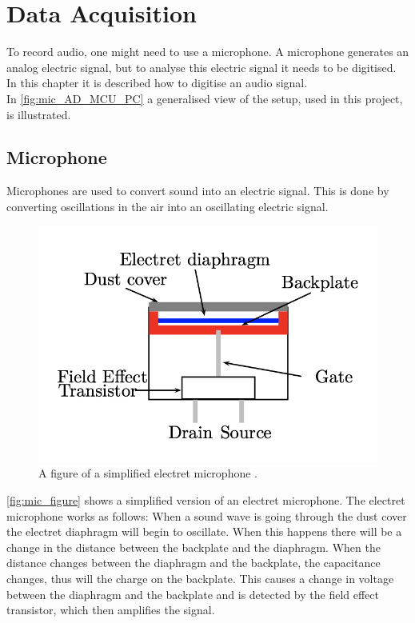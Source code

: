 \chapter{Data Acquisition}
To record audio, one might need to use a microphone. A microphone generates an analog electric signal, but to analyse this electric signal it needs to be digitised. In this chapter it is described how to digitise an audio signal.\\
In \autoref{fig:mic_AD_MCU_PC} a generalised view of the setup, used in this project, is illustrated.




\section{Microphone}
Microphones are used to convert sound into an electric signal. This is done by converting oscillations in the air into an oscillating electric signal. 

\begin{figure}[H]
    \centering
    \includegraphics[scale=0.65]{figures/Microphone_figure.png}
    \caption{A figure of a simplified electret microphone \cite[p. 160]{LectureNotes}.}
    \label{fig:mic_figure}
\end{figure}

\autoref{fig:mic_figure} shows a simplified version of an electret microphone. The electret microphone works as follows: When a sound wave is going through the dust cover the electret diaphragm will begin to oscillate. When this happens there will be a change in the distance between the backplate and the diaphragm. When the distance changes between the diaphragm and the backplate, the capacitance changes, thus will the charge on the backplate. This causes a change in voltage between the diaphragm and the backplate and is detected by the field effect transistor, which then amplifies the signal.

